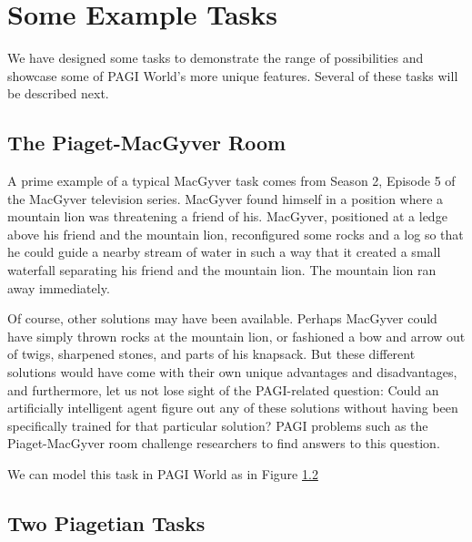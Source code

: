 \section{Some Example Tasks}
\label{sect:example_tasks}

We have designed some tasks to demonstrate the range of possibilities and showcase some of PAGI World's more unique features. Several of these tasks will be described next.

\subsection{The Piaget-MacGyver Room}
\label{sect:macgyver}

A prime example of a typical MacGyver task comes from Season 2, Episode 5 of the MacGyver television series. MacGyver found himself in a position where a mountain lion was threatening a friend of his. MacGyver, positioned at a ledge above his friend and the mountain lion, reconfigured some rocks and a log so that he could guide a nearby stream of water in such a way that it created a small waterfall separating his friend and the mountain lion. The mountain lion ran away immediately.

Of course, other solutions may have been available. Perhaps MacGyver could have simply thrown rocks at the mountain lion, or fashioned a bow and arrow out of twigs, sharpened stones, and parts of his knapsack. But these different solutions would have come with their own unique advantages and disadvantages, and furthermore, let us not lose sight of the PAGI-related question: Could an artificially intelligent agent figure out any of these solutions without having been specifically trained for that particular solution? PAGI problems such as the Piaget-MacGyver room challenge researchers to find answers to this question.

We can model this task in PAGI World as in Figure \ref{} %

\subsection{Two Piagetian Tasks}

